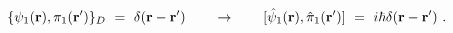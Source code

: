 \begin{equation}
\{\psi _{1}({\bf r}),\pi _{1}({\bf r^{\prime }})\}_{D}\ =\ \delta ({\bf r}-%
{\bf r^{\prime }})\qquad \rightarrow \qquad \lbrack \hat{\psi}_{1}({\bf r}),%
\hat{\pi}_{1}({\bf r^{\prime }})]\ =\ i\hbar \delta ({\bf r}-{\bf r^{\prime }%
})\ .  \label{qscheme2}
\end{equation}%
